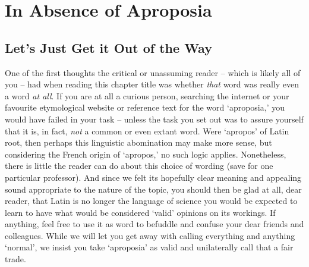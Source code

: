 %
%
%
\chapter{In Absence of Aproposia}
\label{chap:apropos} %



\section{Let's Just Get it Out of the Way}
\label{sec:aproposia-is-not-a-word}
\noindent One of the first thoughts the critical or unassuming reader -- which is likely all of you -- had when reading this chapter title was whether \emph{that} word was really even a word \emph{at all}. If you are at all a curious person, searching the internet or your favourite etymological website or reference text for the word `aproposia,' you would have failed in your task -- unless the task you set out was to assure yourself that it is, in fact, \emph{not} a common or even extant word. Were `apropos' of Latin root, then perhaps this linguistic abomination may make more sense, but considering the French origin of `apropos,' no such logic applies. Nonetheless, there is little the reader can do about this choice of wording (save for one particular professor). And since we felt its hopefully clear meaning and appealing sound appropriate to the nature of the topic, you should then be glad at all, dear reader, that Latin is no longer the language of science you would be expected to learn to have what would be considered `valid' opinions on its workings. If anything, feel free to use it as word to befuddle and confuse your dear friends and colleagues. While we will let you get away with calling everything and anything `normal', we insist you take `aproposia' as valid and unilaterally call that a fair trade.

